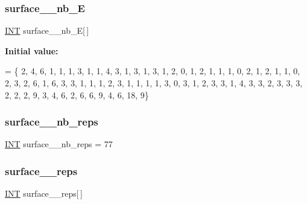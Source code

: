 \subsubsection{\texorpdfstring{surface\+\_\+\_\+nb\+\_\+E}{surface\_37\_nb\_E}}
{\footnotesize\ttfamily \mbox{\hyperlink{galois_8h_a09fddde158a3a20bd2dcadb609de11dc}{I\+NT}} surface\+\_\+\_\+nb\+\_\+E\mbox{[}$\,$\mbox{]}}

{\bfseries Initial value\+:}
\begin{DoxyCode}
= \{ 
    2, 4, 6, 1, 1, 1, 3, 1, 1, 4, 
    3, 1, 3, 1, 3, 1, 2, 0, 1, 2, 
    1, 1, 1, 0, 2, 1, 2, 1, 1, 0, 
    2, 3, 2, 6, 1, 6, 3, 3, 1, 1, 
    1, 2, 3, 1, 1, 1, 1, 3, 0, 3, 
    1, 2, 3, 3, 1, 4, 3, 3, 2, 3, 
    3, 3, 2, 2, 2, 9, 3, 4, 6, 2, 
    6, 6, 9, 4, 6, 18, 9\}
\end{DoxyCode}
\mbox{\label{surface__37_8_c_a17e1e6e2a6e73789c119ebaa1f2c80a7}} 
\subsubsection{\texorpdfstring{surface\+\_\+\_\+nb\+\_\+reps}{surface\_37\_nb\_reps}}
{\footnotesize\ttfamily \mbox{\hyperlink{galois_8h_a09fddde158a3a20bd2dcadb609de11dc}{I\+NT}} surface\+\_\+\_\+nb\+\_\+reps = 77}

\mbox{\label{surface__37_8_c_a3bdbbd288e5dd12ff5b388c4c0cbb552}} 
\subsubsection{\texorpdfstring{surface\+\_\+\_\+reps}{surface\_37\_reps}}
{\footnotesize\ttfamily \mbox{\hyperlink{galois_8h_a09fddde158a3a20bd2dcadb609de11dc}{I\+NT}} surface\+\_\+\_\+reps\mbox{[}$\,$\mbox{]}}

\mbox{\label{surface__37_8_c_a4b2923135ad5cd9fdb627840312bac42}} 
